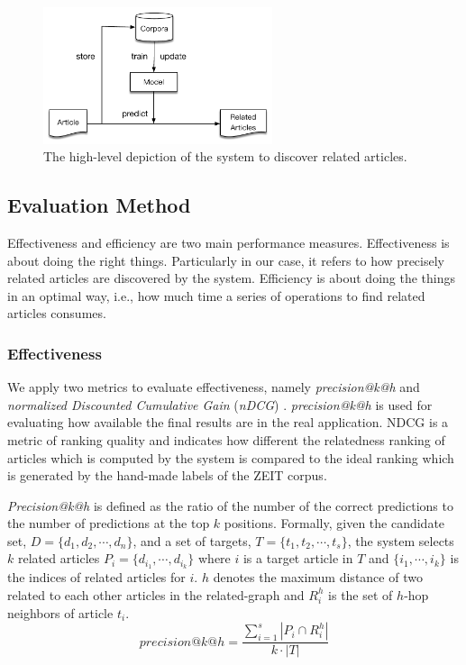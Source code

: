 \begin{figure}[!htb]
    \centering
    \includegraphics[width=0.6\textwidth]{fig/high-level.pdf}
    \caption{The high-level depiction of the system to discover related articles. }
    \label{fig:highlevel}
\end{figure}
\bigbreak
\subsection{Evaluation Method}
\label{sec:3.3}

Effectiveness and efficiency are two main performance measures. Effectiveness is about doing the right things. Particularly in our case, it refers to how precisely related articles are discovered by the system. Efficiency is about doing the things in an optimal way, i.e., how much time a series of operations to find related articles consumes. 

\subsubsection{Effectiveness}

We apply two metrics to evaluate effectiveness, namely \textit{precision@k@h} \citep{introduction2IR} and \textit{normalized Discounted Cumulative Gain} (\textit{nDCG}) \citep{jarvelin2002cumulated}. \textit{precision@k@h} \citep{introduction2IR} is used for evaluating how available the final results are in the real application. NDCG is a metric of ranking quality and indicates how different the relatedness ranking of articles which is computed by the system is compared to the ideal ranking which is generated by the hand-made labels of the ZEIT corpus. 

\textit{Precision@k@h} is defined as the ratio of the number of the correct predictions to the number of predictions at the top $k$ positions. Formally, given the candidate set, $D = \{d_1, d_2, \cdots, d_n\}$, and a set of targets, $T = \{t_1, t_2, \cdots, t_s\}$, the system selects $k$ related articles $P_i = \{d_{i_1}, \cdots, d_{i_k}\}$ where $i$ is a target article in $T$ and $\{i_1, \cdots, i_k\}$ is the indices of related articles for $i$. $h$ denotes the maximum distance of two related to each other articles in the related-graph and $R_i^h$ is the set of $h$-hop neighbors of article $t_i$. 
\begin{equation}
    precision@k@h = \frac{\sum_{i=1}^s{|P_i \cap R_i^h|}}{k \cdot |T|}
\end{equation}

